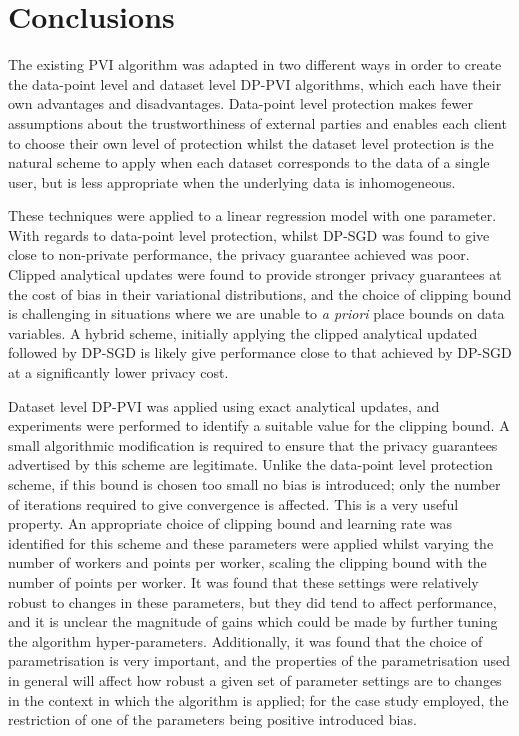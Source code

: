 
\chapter{Conclusions}
%
\graphicspath{{Conclusions/Figs}}
The existing PVI algorithm was adapted in two different ways in order to create the data-point level and dataset level DP-PVI algorithms, which each have their own advantages and disadvantages. Data-point level protection makes fewer assumptions about the trustworthiness of external parties and enables each client to choose their own level of protection whilst the dataset level protection is the natural scheme to apply when each dataset corresponds to the data of a single user, but is less appropriate when the underlying data is inhomogeneous. 

These techniques were applied to a linear regression model with one parameter. With regards to data-point level protection, whilst DP-SGD was found to give close to non-private performance, the privacy guarantee achieved was poor. Clipped analytical updates were found to provide stronger privacy guarantees at the cost of bias in their variational distributions, and the choice of clipping bound is challenging in situations where we are unable to \emph{a priori} place bounds on data variables. A hybrid scheme, initially applying the clipped analytical updated followed by DP-SGD is likely give performance close to that achieved by DP-SGD at a significantly lower privacy cost. 

Dataset level DP-PVI was applied using exact analytical updates, and experiments were performed to identify a suitable value for the clipping bound. A small algorithmic modification is required to ensure that the privacy guarantees advertised by this scheme are legitimate. Unlike the data-point level protection scheme, if this bound is chosen too small no bias is introduced; only the number of iterations required to give convergence is affected. This is a very useful property. An appropriate choice of clipping bound and learning rate was identified for this scheme and these parameters were applied whilst varying the number of workers and points per worker, scaling the clipping bound with the number of points per worker. It was found that these settings were relatively robust to changes in these parameters, but they did tend to affect performance, and it is unclear the magnitude of gains which could be made by further tuning the algorithm hyper-parameters. Additionally, it was found that the choice of parametrisation is very important, and the properties of the parametrisation used in general will affect how robust a given set of parameter settings are to changes in the context in which the algorithm is applied; for the case study employed, the restriction of one of the parameters being positive introduced bias.


